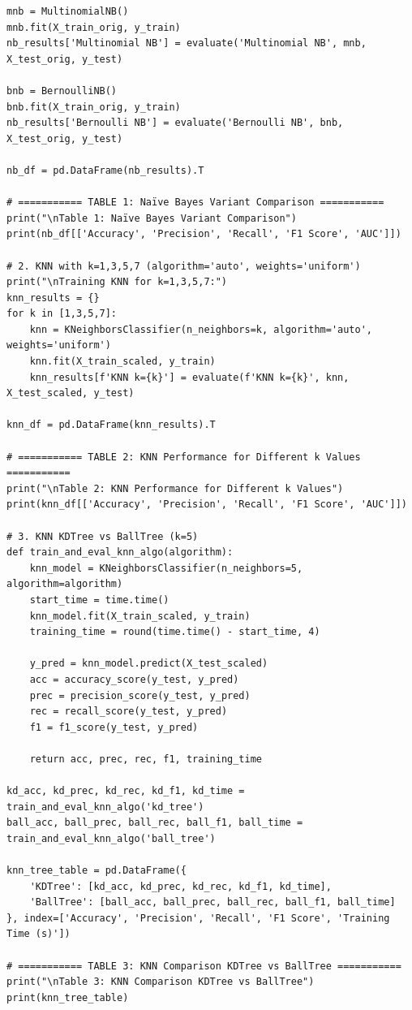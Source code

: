 \documentclass[12pt]{article}
\begin{document}
\begin{verbatim}
mnb = MultinomialNB()
mnb.fit(X_train_orig, y_train)
nb_results['Multinomial NB'] = evaluate('Multinomial NB', mnb, X_test_orig, y_test)

bnb = BernoulliNB()
bnb.fit(X_train_orig, y_train)
nb_results['Bernoulli NB'] = evaluate('Bernoulli NB', bnb, X_test_orig, y_test)

nb_df = pd.DataFrame(nb_results).T

# =========== TABLE 1: Naïve Bayes Variant Comparison ===========
print("\nTable 1: Naïve Bayes Variant Comparison")
print(nb_df[['Accuracy', 'Precision', 'Recall', 'F1 Score', 'AUC']])

# 2. KNN with k=1,3,5,7 (algorithm='auto', weights='uniform')
print("\nTraining KNN for k=1,3,5,7:")
knn_results = {}
for k in [1,3,5,7]:
    knn = KNeighborsClassifier(n_neighbors=k, algorithm='auto', weights='uniform')
    knn.fit(X_train_scaled, y_train)
    knn_results[f'KNN k={k}'] = evaluate(f'KNN k={k}', knn, X_test_scaled, y_test)

knn_df = pd.DataFrame(knn_results).T

# =========== TABLE 2: KNN Performance for Different k Values ===========
print("\nTable 2: KNN Performance for Different k Values")
print(knn_df[['Accuracy', 'Precision', 'Recall', 'F1 Score', 'AUC']])

# 3. KNN KDTree vs BallTree (k=5)
def train_and_eval_knn_algo(algorithm):
    knn_model = KNeighborsClassifier(n_neighbors=5, algorithm=algorithm)
    start_time = time.time()
    knn_model.fit(X_train_scaled, y_train)
    training_time = round(time.time() - start_time, 4)

    y_pred = knn_model.predict(X_test_scaled)
    acc = accuracy_score(y_test, y_pred)
    prec = precision_score(y_test, y_pred)
    rec = recall_score(y_test, y_pred)
    f1 = f1_score(y_test, y_pred)

    return acc, prec, rec, f1, training_time

kd_acc, kd_prec, kd_rec, kd_f1, kd_time = train_and_eval_knn_algo('kd_tree')
ball_acc, ball_prec, ball_rec, ball_f1, ball_time = train_and_eval_knn_algo('ball_tree')

knn_tree_table = pd.DataFrame({
    'KDTree': [kd_acc, kd_prec, kd_rec, kd_f1, kd_time],
    'BallTree': [ball_acc, ball_prec, ball_rec, ball_f1, ball_time]
}, index=['Accuracy', 'Precision', 'Recall', 'F1 Score', 'Training Time (s)'])

# =========== TABLE 3: KNN Comparison KDTree vs BallTree ===========
print("\nTable 3: KNN Comparison KDTree vs BallTree")
print(knn_tree_table)


\end{verbatim}
\end{document}
